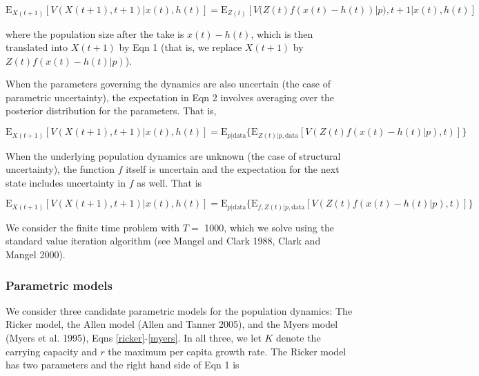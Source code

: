 \documentclass[author-year, 12pt,review]{components/elsarticle} %
\begin{document}
\begin{equation}
\mathbf{\mathrm{E}}_{X(t+1)} \left[ V( X(t+1),t+1) | x(t), h(t) \right] = \mathbf{\mathrm{E}}_{Z(t)} \left[V( Z(t) f(x(t) - h(t))|p), t+1 | x(t), h(t) \right]
\end{equation}

where the population size after the take is $x(t) - h(t)$, which is then
translated into $X(t+1)$ by Eqn 1 (that is, we replace $X(t+1)$ by
$Z(t) f(x(t)-h(t)|p)$).

When the parameters governing the dynamics are also uncertain (the case
of parametric uncertainty), the expectation in Eqn 2 involves averaging
over the posterior distribution for the parameters. That is,

\begin{equation}
\mathbf{\mathrm{E}}_{X(t+1)} \left[ V(X(t+1), t+1) | x(t), h(t) \right] = \mathbf{\mathrm{E}}_{p|\mathrm{data}} \{ \mathbf{\mathrm{E}}_{Z(t) | p, \mathrm{data}} \left[ V(Z(t) f(x(t) - h(t)|p), t)  \right] \}
\end{equation}

When the underlying population dynamics are unknown (the case of
structural uncertainty), the function $f$ itself is uncertain and the
expectation for the next state includes uncertainty in $f$ as well. That
is

\begin{equation}
\mathbf{\mathrm{E}}_{X(t+1)} \left[ V(X(t+1), t+1) | x(t), h(t) \right] = \mathbf{\mathrm{E}}_{p|\mathrm{data}} \{ \mathbf{\mathrm{E}}_{f, Z(t) | p, \mathrm{data}} \left[ V( Z(t) f(x(t) - h(t)|p), t) \right] \}
\end{equation}

We consider the finite time problem with $T=$ 1000, which we solve using
the standard value iteration algorithm (see Mangel and Clark 1988, Clark
and Mangel 2000).

\subsubsection{Parametric models}\label{parametric-models}

We consider three candidate parametric models for the population
dynamics: The Ricker model, the Allen model (Allen and Tanner 2005), and
the Myers model (Myers et al. 1995), Eqns \eqref{ricker}-\eqref{myers}.
In all three, we let $K$ denote the carrying capacity and $r$ the
maximum per capita growth rate. The Ricker model has two parameters and
the right hand side of Eqn 1 is
\end{document}
